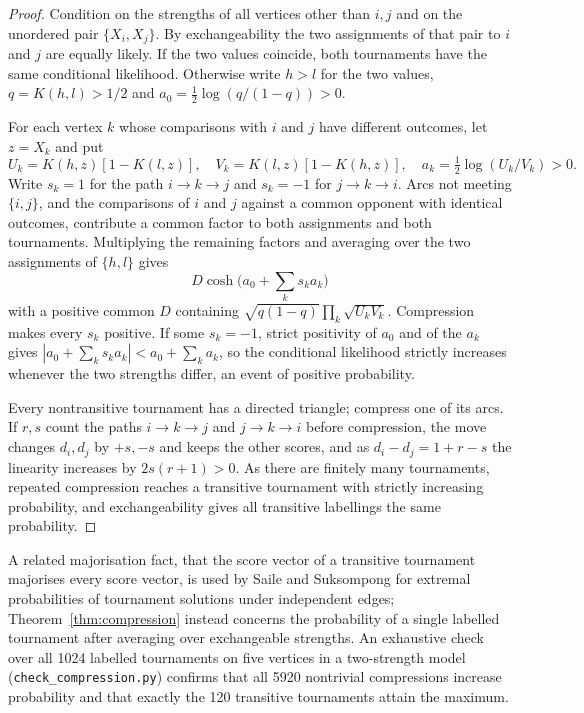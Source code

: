 \documentclass[11pt,a4paper]{article}
\theoremstyle{definition}
\begin{document}
\begin{proof}
Condition on the strengths of all vertices other than $i,j$ and on the unordered pair $\{X_i,X_j\}$. By exchangeability the two assignments of that pair to $i$ and $j$ are equally likely. If the two values coincide, both tournaments have the same conditional likelihood. Otherwise write $h>l$ for the two values, $q=K(h,l)>1/2$ and $a_0=\frac12\log(q/(1-q))>0$.

For each vertex $k$ whose comparisons with $i$ and $j$ have different outcomes, let $z=X_k$ and put
\[
 U_k=K(h,z)[1-K(l,z)],\quad V_k=K(l,z)[1-K(h,z)],\quad
 a_k=\tfrac12\log(U_k/V_k)>0 .
\]
Write $s_k=1$ for the path $i\to k\to j$ and $s_k=-1$ for $j\to k\to i$. Arcs not meeting $\{i,j\}$, and the comparisons of $i$ and $j$ against a common opponent with identical outcomes, contribute a common factor to both assignments and both tournaments. Multiplying the remaining factors and averaging over the two assignments of $\{h,l\}$ gives
\[
 D\cosh\!\Big(a_0+\sum_k s_k a_k\Big)
\]
with a positive common $D$ containing $\sqrt{q(1-q)}\prod_k\sqrt{U_kV_k}$. Compression makes every $s_k$ positive. If some $s_k=-1$, strict positivity of $a_0$ and of the $a_k$ gives $|a_0+\sum_k s_ka_k|<a_0+\sum_k a_k$, so the conditional likelihood strictly increases whenever the two strengths differ, an event of positive probability.

Every nontransitive tournament has a directed triangle; compress one of its arcs. If $r,s$ count the paths $i\to k\to j$ and $j\to k\to i$ before compression, the move changes $d_i,d_j$ by $+s,-s$ and keeps the other scores, and as $d_i-d_j=1+r-s$ the linearity increases by $2s(r+1)>0$. As there are finitely many tournaments, repeated compression reaches a transitive tournament with strictly increasing probability, and exchangeability gives all transitive labellings the same probability.
\end{proof}

A related majorisation fact, that the score vector of a transitive tournament majorises every score vector, is used by Saile and Suksompong \cite[Lemma~6]{saile} for extremal probabilities of tournament solutions under independent edges; Theorem~\ref{thm:compression} instead concerns the probability of a single labelled tournament after averaging over exchangeable strengths. An exhaustive check over all 1024 labelled tournaments on five vertices in a two-strength model (\texttt{check\_compression.py}) confirms that all 5920 nontrivial compressions increase probability and that exactly the 120 transitive tournaments attain the maximum.
\end{document}
